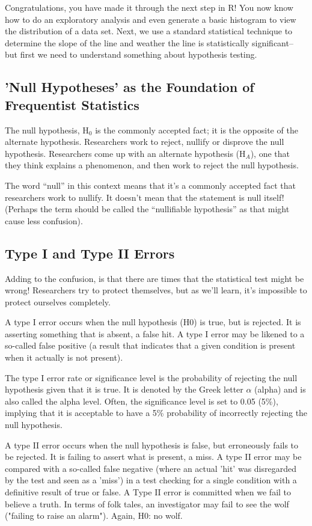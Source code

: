 \documentclass{article}\usepackage[]{graphicx}\usepackage[]{color}
\begin{document}
Congratulations, you have made it through the next step in R!  You now know how to do an exploratory analysis and even generate a basic histogram to view the distribution of a data set. Next, we use a standard statistical technique to determine the slope of the line and weather the line is statistically significant-- but first we need to understand something about hypothesis testing.

\subsection{'Null Hypotheses' as the Foundation of Frequentist Statistics}

The null hypothesis, H$_0$ is the commonly accepted fact; it is the opposite of the alternate hypothesis. Researchers work to reject, nullify or disprove the null hypothesis. Researchers come up with an alternate hypothesis (H$_A$), one that they think explains a phenomenon, and then work to reject the null hypothesis.

The word “null” in this context means that it’s a commonly accepted fact that researchers work to nullify. It doesn’t mean that the statement is null itself! (Perhaps the term should be called the “nullifiable hypothesis” as that might cause less confusion).

\subsection{Type I and Type II Errors}

Adding to the confusion, is that there are times that the statistical test might be wrong!  Researchers try to protect themselves, but as we'll learn, it's impossible to protect ourselves completely. 

A type I error occurs when the null hypothesis (H0) is true, but is rejected. It is asserting something that is absent, a false hit. A type I error may be likened to a so-called false positive (a result that indicates that a given condition is present when it actually is not present).

The type I error rate or significance level is the probability of rejecting the null hypothesis given that it is true. It is denoted by the Greek letter $\alpha$ (alpha) and is also called the alpha level. Often, the significance level is set to 0.05 (5\%), implying that it is acceptable to have a 5\% probability of incorrectly rejecting the null hypothesis.

A type II error occurs when the null hypothesis is false, but erroneously fails to be rejected. It is failing to assert what is present, a miss. A type II error may be compared with a so-called false negative (where an actual 'hit' was disregarded by the test and seen as a 'miss') in a test checking for a single condition with a definitive result of true or false. A Type II error is committed when we fail to believe a truth. In terms of folk tales, an investigator may fail to see the wolf ("failing to raise an alarm"). Again, H0: no wolf.
\end{document}
